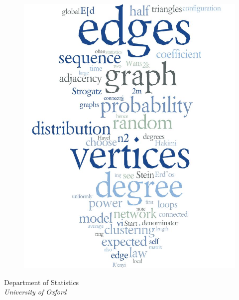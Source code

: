 \begin{titlepage}
{
\maketitle

\bigskip
\begin{figure}[H]
    \centering
    \includegraphics[scale = 0.4]{figures/cover.jpg}
\end{figure}
\begin{center}
    \Large
    Department of Statistics\\
    \textit{University of Oxford}\\
\end{center}
}
\end{titlepage}
\newpage